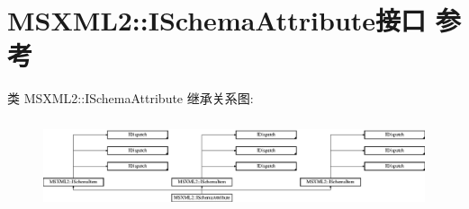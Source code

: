 \hypertarget{interface_m_s_x_m_l2_1_1_i_schema_attribute}{}\section{M\+S\+X\+M\+L2\+:\+:I\+Schema\+Attribute接口 参考}
\label{interface_m_s_x_m_l2_1_1_i_schema_attribute}
类 M\+S\+X\+M\+L2\+:\+:I\+Schema\+Attribute 继承关系图\+:\begin{figure}[H]
\begin{center}
\leavevmode
\includegraphics[height=2.681992cm]{interface_m_s_x_m_l2_1_1_i_schema_attribute}
\end{center}
\end{figure}
